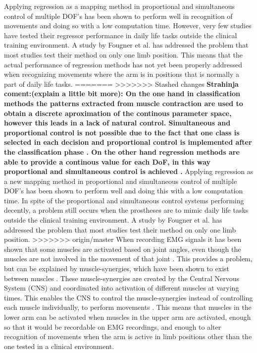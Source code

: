 Applying regression as a mapping method in proportional and simultaneous control of multiple DOF's has been shown to perform well in recognition of movements and doing so with a low computation time. \cite{hahne2014} However, very few studies have tested their regressor performance in daily life tasks outside the clinical training environment. \cite{jiang2012} A study by Fougner et al. \cite{Fougner2011} has addressed the problem that most studies test their method on only one limb position. This means that the actual performance of regression methods has not yet been properly addressed when recognizing movements where the arm is in positions that is normally a part of daily life tasks. 
=======
>>>>>>> Stashed changes
\textbf{Strahinja coment:(explain a little bit more): On the one hand in classification methods the patterns extracted from muscle contraction are used to obtain a discrete aproximation of the continous parameter space, however this leads in a lack of natural control. Simultaneous and proportional control is not possible due to the fact that one class is selected in each decision and proportional control is implemented after the classification phase \cite{jiang2010}. On the other hand regression methods are able to provide a continous value for each DoF, in this way proportional and simultaneous control is achieved \cite{hahne2014}. }  
Applying regression as a new mapping method in proportional and simultaneous control of multiple DOF's has been shown to perform well and doing this with a low computation time. \cite{hahne2014} In spite of the proportional and simultaneous control systems performing decently, a problem still occurs when the prostheses are to mimic daily life tasks outside the clinical training environment. \cite{jiang2012}
A study by Fougner et al. \cite{Fougner2011} has addressed the problem that most studies test their method on only one limb position.
>>>>>>> origin/master
When recording EMG signals it has been shown that some muscles are activated based on joint angles, even though the muscles are not involved in the movement of that joint \cite{Fougner2011}. This provides a problem, but can be explained by muscle-synergies, which have been shown to exist between muscles \cite{DeRugy2013}. These muscle-synergies are created by the Central Nervous System (CNS) and coordinated into activation of different muscles at varying times. This enables the CNS to control the muscle-synergies instead of controlling each muscle individually, to perform movements \cite{jinang2009}. This means that muscles in the lower arm can be activated when muscles in the upper arm are activated, enough so that it would be recordable on EMG recordings, and enough to alter recognition of movements when the arm is active in limb positions other than the one tested in a clinical environment. 

